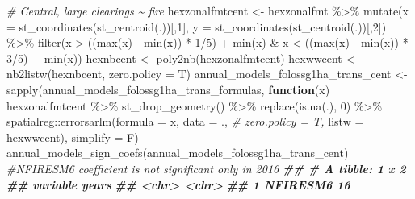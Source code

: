\documentclass[10pt,landscape,a3paper]{article}
\newenvironment{Shaded}{\begin{snugshade}}{\end{snugshade}}
\newcommand{\AttributeTok}[1]{\textcolor[rgb]{0.77,0.63,0.00}{#1}}
\newcommand{\CommentTok}[1]{\textcolor[rgb]{0.56,0.35,0.01}{\textit{#1}}}
\newcommand{\ControlFlowTok}[1]{\textcolor[rgb]{0.13,0.29,0.53}{\textbf{#1}}}
\newcommand{\DecValTok}[1]{\textcolor[rgb]{0.00,0.00,0.81}{#1}}
\newcommand{\DocumentationTok}[1]{\textcolor[rgb]{0.56,0.35,0.01}{\textbf{\textit{#1}}}}
\newcommand{\FunctionTok}[1]{\textcolor[rgb]{0.00,0.00,0.00}{#1}}
\newcommand{\NormalTok}[1]{#1}
\newcommand{\OtherTok}[1]{\textcolor[rgb]{0.56,0.35,0.01}{#1}}
\newcommand{\SpecialCharTok}[1]{\textcolor[rgb]{0.00,0.00,0.00}{#1}}
\begin{document}
\begin{Shaded}
\begin{Highlighting}[]
\CommentTok{\# Central, large clearings \textasciitilde{} fire}
\NormalTok{hexzonalfmtcent }\OtherTok{\textless{}{-}}\NormalTok{ hexzonalfmt }\SpecialCharTok{\%\textgreater{}\%}
  \FunctionTok{mutate}\NormalTok{(}\AttributeTok{x =} \FunctionTok{st\_coordinates}\NormalTok{(}\FunctionTok{st\_centroid}\NormalTok{(.))[,}\DecValTok{1}\NormalTok{], }\AttributeTok{y =} \FunctionTok{st\_coordinates}\NormalTok{(}\FunctionTok{st\_centroid}\NormalTok{(.))[,}\DecValTok{2}\NormalTok{]) }\SpecialCharTok{\%\textgreater{}\%}
  \FunctionTok{filter}\NormalTok{(x }\SpecialCharTok{\textgreater{}}\NormalTok{ ((}\FunctionTok{max}\NormalTok{(x) }\SpecialCharTok{{-}} \FunctionTok{min}\NormalTok{(x)) }\SpecialCharTok{*} \DecValTok{1}\SpecialCharTok{/}\DecValTok{5}\NormalTok{) }\SpecialCharTok{+} \FunctionTok{min}\NormalTok{(x) }\SpecialCharTok{\&}\NormalTok{ x }\SpecialCharTok{\textless{}}\NormalTok{ ((}\FunctionTok{max}\NormalTok{(x) }\SpecialCharTok{{-}} \FunctionTok{min}\NormalTok{(x)) }\SpecialCharTok{*} \DecValTok{3}\SpecialCharTok{/}\DecValTok{5}\NormalTok{) }\SpecialCharTok{+} \FunctionTok{min}\NormalTok{(x))}
\NormalTok{hexnbcent }\OtherTok{\textless{}{-}} \FunctionTok{poly2nb}\NormalTok{(hexzonalfmtcent)}
\NormalTok{hexwwcent }\OtherTok{\textless{}{-}} \FunctionTok{nb2listw}\NormalTok{(hexnbcent, }\AttributeTok{zero.policy =}\NormalTok{ T)}
\NormalTok{annual\_models\_folossg1ha\_trans\_cent }\OtherTok{\textless{}{-}} \FunctionTok{sapply}\NormalTok{(annual\_models\_folossg1ha\_trans\_formulas,}
                        \ControlFlowTok{function}\NormalTok{(x)}
\NormalTok{                          hexzonalfmtcent }\SpecialCharTok{\%\textgreater{}\%}
                          \FunctionTok{st\_drop\_geometry}\NormalTok{() }\SpecialCharTok{\%\textgreater{}\%}
                          \FunctionTok{replace}\NormalTok{(}\FunctionTok{is.na}\NormalTok{(.), }\DecValTok{0}\NormalTok{) }\SpecialCharTok{\%\textgreater{}\%}
\NormalTok{                          spatialreg}\SpecialCharTok{::}\FunctionTok{errorsarlm}\NormalTok{(}\AttributeTok{formula =}\NormalTok{ x,}
                                                 \AttributeTok{data =}\NormalTok{ ., }\CommentTok{\# zero.policy = T,}
                                                 \AttributeTok{listw =}\NormalTok{ hexwwcent),}
                        \AttributeTok{simplify =}\NormalTok{ F)}
\FunctionTok{annual\_models\_sign\_coefs}\NormalTok{(annual\_models\_folossg1ha\_trans\_cent) }\CommentTok{\#NFIRESM6 coefficient is not significant only in 2016}
\DocumentationTok{\#\# \# A tibble: 1 x 2}
\DocumentationTok{\#\#   variable years}
\DocumentationTok{\#\#   \textless{}chr\textgreater{}    \textless{}chr\textgreater{}}
\DocumentationTok{\#\# 1 NFIRESM6 16}


\end{Highlighting}
\end{Shaded}
\end{document}
